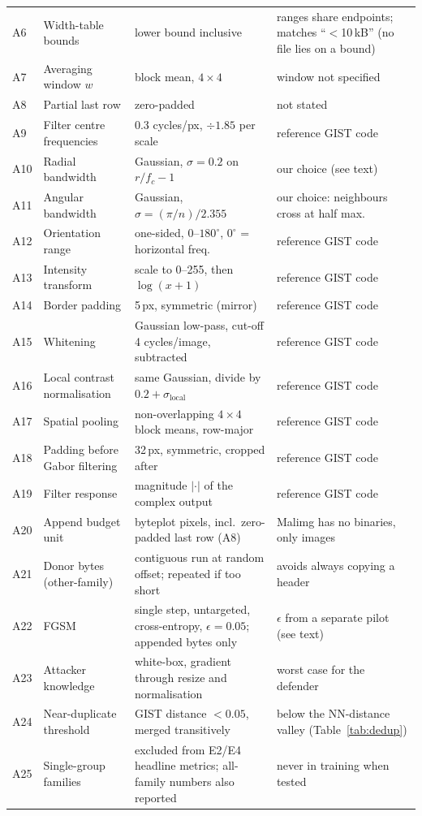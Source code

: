 \documentclass[conference]{IEEEtran}
\begin{document}
\begin{table}[t]
\begin{tabular}{@{}l p{3.3cm} p{6.2cm} p{6.2cm}@{}}
A6 & Width-table bounds & lower bound inclusive & ranges share endpoints; matches ``$<$10\,kB'' (no file lies on a bound) \\
A7 & Averaging window $w$ & block mean, $4\times4$ & window not specified \\
A8 & Partial last row & zero-padded & not stated \\
A9  & Filter centre frequencies & 0.3 cycles/px, $\div 1.85$ per scale & reference GIST code \cite{oliva2001gist} \\
A10 & Radial bandwidth & Gaussian, $\sigma = 0.2$ on $r/f_c - 1$ & our choice (see text) \\
A11 & Angular bandwidth & Gaussian, $\sigma = (\pi/n)/2.355$ & our choice: neighbours cross at half max. \\
A12 & Orientation range & one-sided, $0$--$180^\circ$, $0^\circ$ = horizontal freq. & reference GIST code \cite{oliva2001gist} \\
A13 & Intensity transform & scale to 0--255, then $\log(x+1)$ & reference GIST code \cite{oliva2001gist} \\
A14 & Border padding & 5\,px, symmetric (mirror) & reference GIST code \cite{oliva2001gist} \\
A15 & Whitening & Gaussian low-pass, cut-off 4 cycles/image, subtracted & reference GIST code \cite{oliva2001gist} \\
A16 & Local contrast normalisation & same Gaussian, divide by $0.2 + \sigma_{\text{local}}$ & reference GIST code \cite{oliva2001gist} \\
A17 & Spatial pooling & non-overlapping $4\times4$ block means, row-major & reference GIST code \cite{oliva2001gist} \\
A18 & Padding before Gabor filtering & 32\,px, symmetric, cropped after & reference GIST code \cite{oliva2001gist} \\
A19 & Filter response & magnitude $|\cdot|$ of the complex output & reference GIST code \cite{oliva2001gist} \\
A20 & Append budget unit & byteplot pixels, incl.\ zero-padded last row (A8) & Malimg has no binaries, only images \\
A21 & Donor bytes (other-family) & contiguous run at random offset; repeated if too short & avoids always copying a header \\
A22 & FGSM & single step, untargeted, cross-entropy, $\epsilon = 0.05$; appended bytes only & $\epsilon$ from a separate pilot (see text) \\
A23 & Attacker knowledge & white-box, gradient through resize and normalisation & worst case for the defender \\
A24 & Near-duplicate threshold & GIST distance $< 0.05$, merged transitively & below the NN-distance valley (Table~\ref{tab:dedup}) \\
A25 & Single-group families & excluded from E2/E4 headline metrics; all-family numbers also reported & never in training when tested \\
\bottomrule
\end{tabular}
\end{table}
\end{document}
